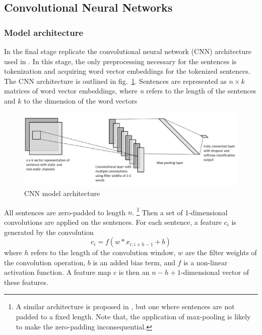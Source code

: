 \documentclass[conference]{IEEEtran}
\begin{document}
\subsection{Convolutional Neural Networks}

\subsubsection{Model architecture}

In the final stage replicate the convolutional neural network (CNN) architecture used in \cite{kim-2014-convolutional}. In this stage, the only preprocessing necessary for the sentences is tokenization and acquiring word vector embeddings for the tokenized sentences. The CNN architecture is outlined in fig.~\ref{fig1}. Sentences are represented as $n\times k$ matrices of word vector embeddings, where \emph{n} refers to the length of the sentences and $k$ to the dimension of the word vectors

\begin{figure}[htbp]
\centerline{\includegraphics[width = \textwidth]{fig1.png}}
\caption{CNN model architecture}
\label{fig1}
\end{figure}

All sentences are zero-padded to length $n$.
\footnote{A similar architecture is proposed in \cite{johnsonetal}, but one where sentences are not padded to a fixed length.  Note that, the application of max-pooling is likely to make the zero-padding inconsequential.}
Then a set of 1-dimensional convolutions are applied on the sentences. For each sentence, a feature $c_i$ is generated by the convolution
\begin{equation}
c_i = f(w * x_{i:i+h-1} + b)\label{eq1}
\end{equation}
where $h$ refers to the length of the convolution window, $w$ are the filter weights of the convolution operation, $b$ is an added bias term, and $f$ is a non-linear activation function. A feature map $c$ is then an $n-h+1$-dimensional vector of these features.
\end{document}

